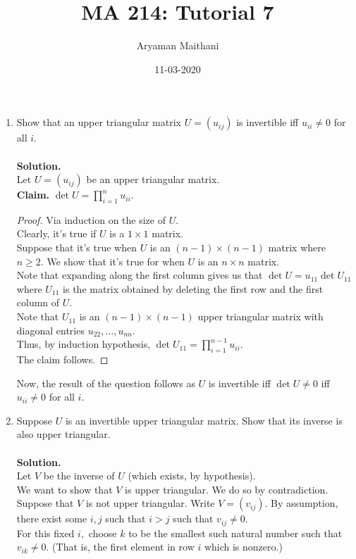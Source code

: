 \documentclass{article}
\title{MA 214: Tutorial 7}
\author{Aryaman Maithani}
\date{11-03-2020}
\begin{document}
\maketitle
\begin{enumerate} 
	\item Show that an upper triangular matrix $U = (u_{ij})$ is invertible iff $u_{ii} \neq 0$ for all $i.$\\~\\
	\textbf{Solution.}\\
	Let $U = (u_{ij})$ be an upper triangular matrix.\\
	\textbf{Claim.} $\det U = \displaystyle\prod_{i = 1}^{n}u_{ii}.$
	\begin{proof} 
		Via induction on the size of $U.$ \\
		Clearly, it's true if $U$ is a $1 \times 1$ matrix.\\
		Suppose that it's true when $U$ is an $(n - 1) \times (n - 1)$ matrix where $n \ge 2.$ We show that it's true for when $U$ is an $n\times n$ matrix.\\
		Note that expanding along the first column gives us that $\det U = u_{11}\det U_{11}$ where $U_{11}$ is the matrix obtained by deleting the first row and the first column of $U.$\\
		Note that $U_{11}$ is an $(n - 1)\times(n - 1)$ upper triangular matrix with diagonal entries $u_{22}, \ldots, u_{nn}.$\\
		Thus, by induction hypothesis, $\det U_{11} = \displaystyle\prod_{i = 1}^{n-1}u_{ii}.$\\
		The claim follows.
	\end{proof}
	Now, the result of the question follows as $U$ is invertible iff $\det U \neq 0$ iff $u_{ii} \neq 0$ for all $i.$
	\item Suppose $U$ is an invertible upper triangular matrix. Show that its inverse is also upper triangular.\\~\\
	\textbf{Solution.}\\
	Let $V$ be the inverse of $U$ (which exists, by hypothesis).\\
	We want to show that $V$ is upper triangular. We do so by contradiction.\\
	Suppose that $V$ is not upper triangular. Write $V = (v_{ij}).$ By assumption, there exist some $i, j$ such that $i > j$ such that $v_{ij} \neq 0.$\\
	For this fixed $i,$ choose $k$ to be the smallest such natural number such that $v_{ik} \neq 0.$ (That is, the first element in row $i$ which is nonzero.)\\

\end{enumerate}
\end{document}
